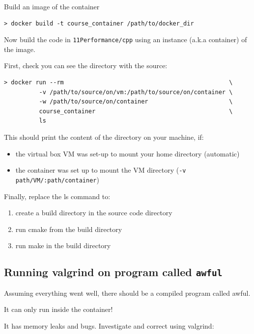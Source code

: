 Build an image of the container

\begin{verbatim}
> docker build -t course_container /path/to/docker_dir
\end{verbatim}

Now build the code in \texttt{11Performance/cpp} using an instance
(a.k.a container) of the image.

First, check you can see the directory with the source:

\begin{verbatim}
> docker run --rm                                               \
          -v /path/to/source/on/vm:/path/to/source/on/container \
          -w /path/to/source/on/container                       \
          course_container                                      \
          ls
\end{verbatim}

This should print the content of the directory on your machine, if:

\begin{itemize}
\itemsep1pt\parskip0pt
\item
  the virtual box VM was set-up to mount your home directory (automatic)
\item
  the container was set up to mount the VM directory
  (\texttt{-v path/VM/:path/container})
\end{itemize}

Finally, replace the ls command to:

\begin{enumerate}
\def\labelenumi{\arabic{enumi}.}
\itemsep1pt\parskip0pt\parsep0pt
\item
  create a build directory in the source code directory
\item
  run cmake from the build directory
\item
  run make in the build directory
\end{enumerate}

\subsection{Running valgrind on program called
\texttt{awful}}\label{running-valgrind-on-program-called-awful}

Assuming everything went well, there should be a compiled program called
awful.

It can only run inside the container!

It has memory leaks and bugs. Investigate and correct using valgrind:

